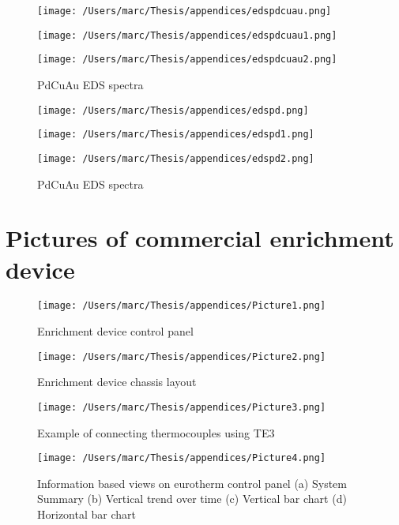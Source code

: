 \begin{figure}[H]
  \texttt{[image: /Users/marc/Thesis/appendices/edspdcuau.png]}
\end{figure}
\begin{figure}[H]
  \texttt{[image: /Users/marc/Thesis/appendices/edspdcuau1.png]}
\end{figure}

\begin{figure}[H]
  \texttt{[image: /Users/marc/Thesis/appendices/edspdcuau2.png]}
  \caption{PdCuAu EDS spectra}
\end{figure}

\begin{figure}[H]
  \texttt{[image: /Users/marc/Thesis/appendices/edspd.png]}
\end{figure}
\begin{figure}[H]
  \texttt{[image: /Users/marc/Thesis/appendices/edspd1.png]}
\end{figure}

\begin{figure}[H]
  \texttt{[image: /Users/marc/Thesis/appendices/edspd2.png]}
  \caption{PdCuAu EDS spectra}
\end{figure}

\section*{Pictures of commercial enrichment device}

\begin{figure}[H]
    \texttt{[image: /Users/marc/Thesis/appendices/Picture1.png]}
    \caption{Enrichment device control panel}
  \end{figure}

  \begin{figure}[H]
    \texttt{[image: /Users/marc/Thesis/appendices/Picture2.png]}
    \caption{Enrichment device chassis layout}
  \end{figure}

  \begin{figure}[H]
    \texttt{[image: /Users/marc/Thesis/appendices/Picture3.png]}
    \caption{Example of connecting thermocouples using TE3}
  \end{figure}

  \begin{figure}[H]
    \texttt{[image: /Users/marc/Thesis/appendices/Picture4.png]}
    \caption{Information based views on eurotherm control panel (a) System Summary (b) Vertical trend over time (c) Vertical bar chart (d) Horizontal bar chart}
  \end{figure}


